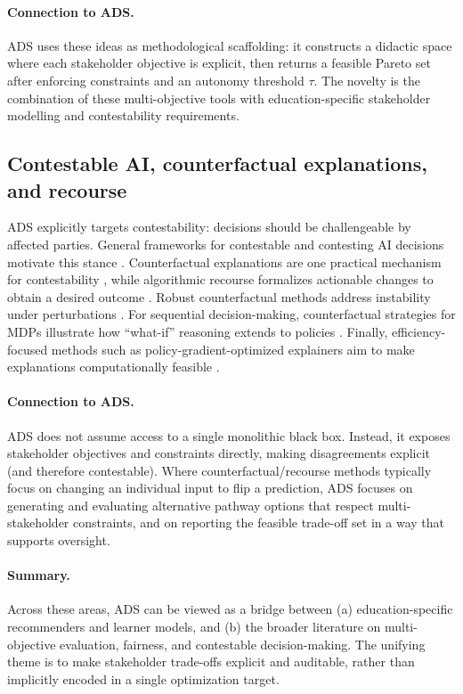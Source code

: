 \paragraph{Connection to ADS.}
ADS uses these ideas as methodological scaffolding: it constructs a didactic space where each stakeholder objective is explicit, then returns a feasible Pareto set after enforcing constraints and an autonomy threshold $\tau$.
The novelty is the combination of these multi-objective tools with education-specific stakeholder modelling and contestability requirements.

\subsection{Contestable AI, counterfactual explanations, and recourse}
\label{sec:rw-contestable}

ADS explicitly targets contestability: decisions should be challengeable by affected parties.
General frameworks for contestable and contesting AI decisions motivate this stance \cite{aler2020contestable,alfrink2023contestable,dignum2025contesting}.
Counterfactual explanations are one practical mechanism for contestability \cite{wachter2017counterfactual}, while algorithmic recourse formalizes actionable changes to obtain a desired outcome \cite{ustun2019recourse}.
Robust counterfactual methods address instability under perturbations \cite{robustx2025}.
For sequential decision-making, counterfactual strategies for MDPs illustrate how ``what-if'' reasoning extends to policies \cite{cfmdp2025}.
Finally, efficiency-focused methods such as policy-gradient-optimized explainers aim to make explanations computationally feasible \cite{pan2025fex}.

\paragraph{Connection to ADS.}
ADS does not assume access to a single monolithic black box.
Instead, it exposes stakeholder objectives and constraints directly, making disagreements explicit (and therefore contestable).
Where counterfactual/recourse methods typically focus on changing an individual input to flip a prediction, ADS focuses on generating and evaluating alternative pathway options that respect multi-stakeholder constraints, and on reporting the feasible trade-off set in a way that supports oversight.

\paragraph{Summary.}
Across these areas, ADS can be viewed as a bridge between (a) education-specific recommenders and learner models, and (b) the broader literature on multi-objective evaluation, fairness, and contestable decision-making.
The unifying theme is to make stakeholder trade-offs explicit and auditable, rather than implicitly encoded in a single optimization target.
